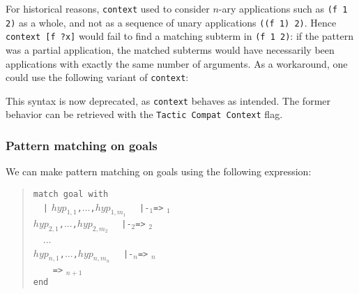\begin{Variants}
\item {}
For historical reasons, {\tt context} used to consider $n$-ary applications
such as {\tt (f 1 2)} as a whole, and not as a sequence of unary
applications {\tt ((f 1) 2)}. Hence {\tt context [f ?x]} would fail
to find a matching subterm in {\tt (f 1 2)}: if the pattern was a partial
application, the matched subterms would have necessarily been
applications with exactly the same number of arguments.
As a workaround, one could use the following variant of {\tt context}:
\begin{quote}
{}
\end{quote}
This syntax is now deprecated, as {\tt context} behaves as intended. The former
behavior can be retrieved with the {\tt Tactic Compat Context} flag.

\end{Variants}

\subsubsection[Pattern matching on goals]{Pattern matching on goals
}

We can make pattern matching on goals using the following expression:
\begin{quote}
\begin{tabbing}
{\tt match goal with}\\
~~\={\tt |} $hyp_{1,1}${\tt ,}...{\tt ,}$hyp_{1,m_1}$
   ~~{\tt |-}{\cpattern}$_1${\tt =>} {\tacexpr}$_1$\\
  \>{\tt |} $hyp_{2,1}${\tt ,}...{\tt ,}$hyp_{2,m_2}$
   ~~{\tt |-}{\cpattern}$_2${\tt =>} {\tacexpr}$_2$\\
~~...\\
  \>{\tt |} $hyp_{n,1}${\tt ,}...{\tt ,}$hyp_{n,m_n}$
   ~~{\tt |-}{\cpattern}$_n${\tt =>} {\tacexpr}$_n$\\
  \>{\tt |\_}~~~~{\tt =>} {\tacexpr}$_{n+1}$\\
{\tt end}
\end{tabbing}
\end{quote}


